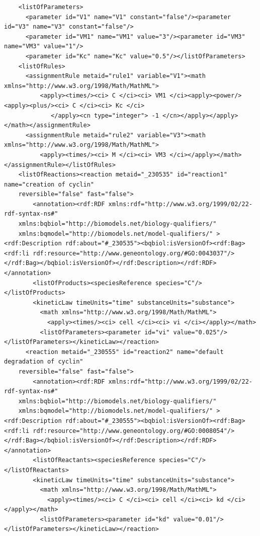\documentclass[a4paper,10pt,titlepage]{article}
\begin{document}
\begin{verbatim}
    <listOfParameters>
      <parameter id="V1" name="V1" constant="false"/><parameter id="V3" name="V3" constant="false"/>
      <parameter id="VM1" name="VM1" value="3"/><parameter id="VM3" name="VM3" value="1"/>
      <parameter id="Kc" name="Kc" value="0.5"/></listOfParameters>
    <listOfRules>
      <assignmentRule metaid="rule1" variable="V1"><math xmlns="http://www.w3.org/1998/Math/MathML">
          <apply><times/><ci> C </ci><ci> VM1 </ci><apply><power/><apply><plus/><ci> C </ci><ci> Kc </ci>
             </apply><cn type="integer"> -1 </cn></apply></apply></math></assignmentRule>
      <assignmentRule metaid="rule2" variable="V3"><math xmlns="http://www.w3.org/1998/Math/MathML">
          <apply><times/><ci> M </ci><ci> VM3 </ci></apply></math></assignmentRule></listOfRules>
    <listOfReactions><reaction metaid="_230535" id="reaction1" name="creation of cyclin" 
	reversible="false" fast="false">
        <annotation><rdf:RDF xmlns:rdf="http://www.w3.org/1999/02/22-rdf-syntax-ns#" 
	xmlns:bqbiol="http://biomodels.net/biology-qualifiers/" 
	xmlns:bqmodel="http://biomodels.net/model-qualifiers/" >
<rdf:Description rdf:about="#_230535"><bqbiol:isVersionOf><rdf:Bag>
<rdf:li rdf:resource="http://www.geneontology.org/#GO:0043037"/>
</rdf:Bag></bqbiol:isVersionOf></rdf:Description></rdf:RDF></annotation>
        <listOfProducts><speciesReference species="C"/></listOfProducts>
        <kineticLaw timeUnits="time" substanceUnits="substance">
          <math xmlns="http://www.w3.org/1998/Math/MathML">
            <apply><times/><ci> cell </ci><ci> vi </ci></apply></math>
          <listOfParameters><parameter id="vi" value="0.025"/></listOfParameters></kineticLaw></reaction>
      <reaction metaid="_230555" id="reaction2" name="default degradation of cyclin" 
	reversible="false" fast="false">
        <annotation><rdf:RDF xmlns:rdf="http://www.w3.org/1999/02/22-rdf-syntax-ns#" 
	xmlns:bqbiol="http://biomodels.net/biology-qualifiers/" 
	xmlns:bqmodel="http://biomodels.net/model-qualifiers/" >
<rdf:Description rdf:about="#_230555"><bqbiol:isVersionOf><rdf:Bag>
<rdf:li rdf:resource="http://www.geneontology.org/#GO:0008054"/>
</rdf:Bag></bqbiol:isVersionOf></rdf:Description></rdf:RDF></annotation>
        <listOfReactants><speciesReference species="C"/></listOfReactants>
        <kineticLaw timeUnits="time" substanceUnits="substance">
          <math xmlns="http://www.w3.org/1998/Math/MathML">
            <apply><times/><ci> C </ci><ci> cell </ci><ci> kd </ci></apply></math>
          <listOfParameters><parameter id="kd" value="0.01"/></listOfParameters></kineticLaw></reaction>

\end{verbatim}
\end{document}
